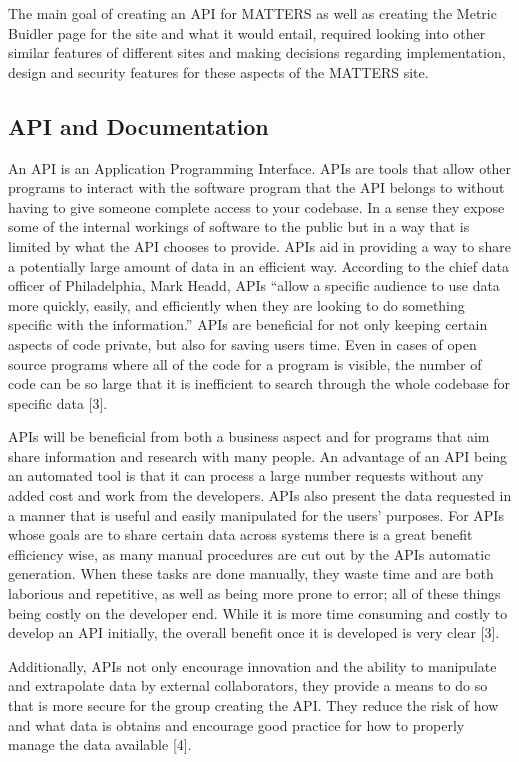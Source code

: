 The main goal of creating an API for MATTERS as well as creating the Metric Buidler page for the site and what it would entail, required looking into other similar features of different sites and making decisions regarding implementation, design and security features for these aspects of the MATTERS site.

\subsection{API and Documentation}

An API is an Application Programming Interface. APIs are tools that allow other programs to interact with the software program that the API belongs to without having to give someone complete access to your codebase. In a sense they expose some of the internal workings of software to the public but in a way that is limited by what the API chooses to provide. APIs aid in providing a way to share a potentially large amount of data in an efficient way. According to the chief data officer of Philadelphia, Mark Headd, APIs “allow a specific audience to use data more quickly, easily, and efficiently when they are looking to do something specific with the information.” APIs are beneficial for not only keeping certain aspects of code private, but also for saving users time. Even in cases of open source programs where all of the code for a program is visible, the number of code can be so large that it is inefficient to search through the whole codebase for specific data [3]. 

APIs will be beneficial from both a business aspect and for programs that aim share information and research with many people. An advantage of an API being an automated tool is that it can process a large number requests without any added cost and work from the developers. APIs also present the data requested in a manner that is useful and easily manipulated for the users’ purposes. For APIs whose goals are to share certain data across systems there is a great benefit efficiency wise, as many manual procedures are cut out by the APIs automatic generation. When these tasks are done manually, they waste time and are both laborious and repetitive, as well as being more prone to error; all of these things being costly on the developer end. While it is more time consuming and costly to develop an API initially, the overall benefit once it is developed is very clear [3].

Additionally, APIs not only encourage innovation and the ability to manipulate and extrapolate data by external collaborators, they provide a means to do so that is more secure for the group creating the API. They reduce the risk of how and what data is obtains and encourage good practice for how to properly manage the data available [4].

